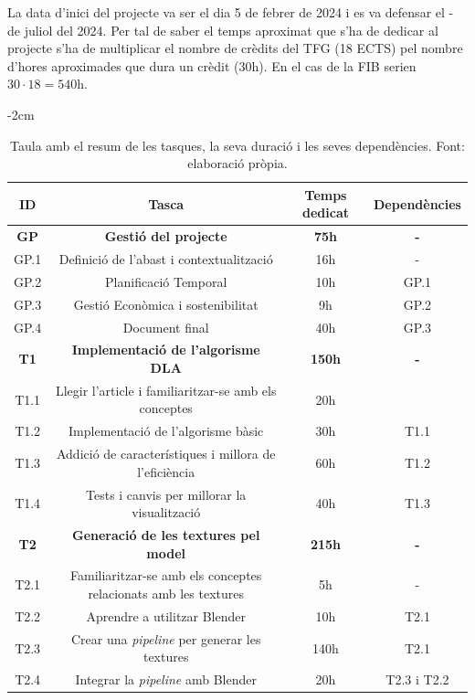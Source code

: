 \documentclass{article}
\begin{document}
La data d'inici del projecte va ser el dia 5 de febrer de 2024 i es va defensar el - de juliol del 2024. Per tal de saber el temps aproximat que s'ha de dedicar al projecte s'ha de multiplicar el nombre de crèdits del TFG (18 ECTS) pel nombre d'hores aproximades que dura un crèdit (30h). En el cas de la FIB serien $30 \cdot 18 = 540$h.

\begin{table}[H]
    \centering
    \addtolength{\leftskip} {-2cm}
    \addtolength{\rightskip}{-2cm}
    \caption{Taula amb el resum de les tasques, la seva duració i les seves dependències. Font: elaboració pròpia.}
    \begin{tabular}{|c|c|c|c|}
         \hline
         ID & Tasca & Temps dedicat & Dependències \\
         \hline
         \hline
         \rowcolor{Gray} \textbf{GP} & \textbf{Gestió del projecte} & \textbf{75h} & \textbf{-} \\
         GP.1 & Definició de l’abast i contextualització & 16h & - \\
         GP.2 & Planificació Temporal & 10h & GP.1 \\
         GP.3 & Gestió Econòmica i sostenibilitat & 9h & GP.2 \\
         GP.4 & Document final & 40h & GP.3 \\
         \hline
         \hline
         \rowcolor{Gray} \textbf{T1} & \textbf{Implementació de l'algorisme DLA} & \textbf{150h} & \textbf{-} \\
         T1.1 & Llegir l'article i familiaritzar-se amb els conceptes & 20h & \\
         T1.2 & Implementació de l'algorisme bàsic & 30h & T1.1 \\
         T1.3 & Addició de característiques i millora de l'eficiència & 60h & T1.2 \\
         T1.4 & Tests i canvis per millorar la visualització & 40h & T1.3 \\
         \hline
         \hline
         \rowcolor{Gray} \textbf{T2} & \textbf{Generació de les textures pel model} & \textbf{215h} & \textbf{-} \\
         T2.1 &  Familiaritzar-se amb els conceptes relacionats amb les textures & 5h & - \\
         T2.2 & Aprendre a utilitzar Blender & 10h & T2.1 \\
         T2.3 & Crear una \textit{pipeline} per generar les textures & 140h & T2.1 \\
         T2.4 & Integrar la \textit{pipeline} amb Blender & 20h & T2.3 i T2.2 \\

\end{tabular}
\end{table}
\end{document}
